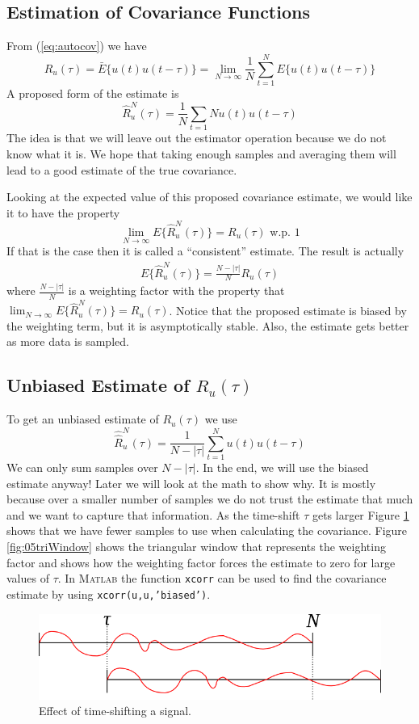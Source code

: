 \documentclass[lecture,12pt,]{pcms-l}
\theoremstyle{example}
\newcommand{\ruhat}{\hat{R}_u^N(\tau)}
\begin{document}
\subsection{Estimation of Covariance Functions}
From (\ref{eq:autocov}) we have
$$R_u(\tau) = \bar{E}\{u(t)u(t-\tau)\} = \lim_{N\to\infty}\frac{1}{N}\sum_{t=1}^N E\{u(t)u(t-\tau)\}$$
A proposed form of the estimate is
$$\hat{R}_u^N(\tau) = \frac{1}{N}\sum_{t=1}{N}u(t)u(t-\tau)$$
The idea is that we will leave out the estimator operation because we do not know what it is. We hope that taking enough samples and averaging them will lead to a good estimate of the true covariance.

Looking at the expected value of this proposed covariance estimate, we would like it to have the property
$$\lim_{N\to\infty} E\{\ruhat\} = R_u(\tau) \text{ w.p. } 1$$
If that is the case then it is called a ``consistent'' estimate. The result is actually
\begin{align}
\label{eq:autocovest}
E\{\ruhat\} = \frac{N-|\tau|}{N}R_u(\tau)
\end{align}
where $\frac{N-|\tau|}{N}$ is a weighting factor with the property that $\lim_{N\to\infty}E\{\ruhat\}=R_u(\tau)$. Notice that the proposed estimate is biased by the weighting term, but it is asymptotically stable. Also, the estimate gets better as more data is sampled.

\subsection{Unbiased Estimate of $R_u(\tau)$}
To get an unbiased estimate of $R_u(\tau)$ we use
$$\hat{\hat{R}}_u^N(\tau) = \frac{1}{N-|\tau|}\sum_{t=1}^Nu(t)u(t-\tau)$$
We can only sum samples over $N-|\tau|$. In the end, we will use the biased estimate anyway! Later we will look at the math to show why. It is mostly because over a smaller number of samples we do not trust the estimate that much and we want to capture that information. As the time-shift $\tau$ gets larger Figure \ref{fig:05timeShift} shows that we have fewer samples to use when calculating the covariance. Figure \ref{fig:05triWindow} shows the triangular window that represents the weighting factor and shows how the weighting factor forces the estimate to zero for large values of $\tau$. In \textsc{Matlab} the function \texttt{xcorr} can be used to find the covariance estimate by using \texttt{xcorr(u,u,'biased')}.
\begin{figure}[ht!]
	\centering
	\includegraphics[width=.6\textwidth]{images/05timeShift}
	\caption{Effect of time-shifting a signal.}
	\label{fig:05timeShift}
\end{figure}
\end{document}
